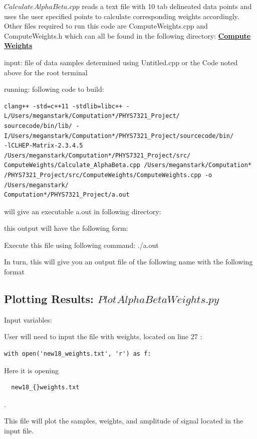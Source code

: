 \documentclass{article}
\begin{document}
$Calculate_{}AlphaBeta.cpp$ reads a text file with 10 tab delineated data points and uses the user specified points to calculate corresponding weights accordingly. 
Other files required to run this code are ComputeWeights.cpp and  ComputeWeights.h which can all be found in the following directory:
\href{https://github.com/atishelmanch/ECAL_Weights/tree/Megan/src/ComputeWeights}{\bf{Compute Weights}}


input: file of data samples determined using Untitled.cpp or the Code noted above for the root terminal 

running: 
following code to build: 

\begin{verbatim} 
clang++ -std=c++11 -stdlib=libc++ -L/Users/meganstark/Computation*/PHYS7321_Project/
sourcecode/bin/lib/ -I/Users/meganstark/Computation*/PHYS7321_Project/sourcecode/bin/ 
-lCLHEP-Matrix-2.3.4.5 /Users/meganstark/Computation*/PHYS7321_Project/src/
ComputeWeights/Calculate_AlphaBeta.cpp /Users/meganstark/Computation*
/PHYS7321_Project/src/ComputeWeights/ComputeWeights.cpp -o /Users/meganstark/
Computation*/PHYS7321_Project/a.out
\end{verbatim}

will give an executable a.out in following directory: 

this output will have the following form: 

Execute this file using following command: ./a.out 

In turn, this will give you an output file of the following name with the following format 

\subsection{Plotting Results:  $ Plot_{}AlphaBetaWeights.py  $ } 

Input variables: 

User will need to input the file with weights, located on line 27 :
\begin{verbatim} 
with open('new18_weights.txt', 'r') as f:  
\end{verbatim}
Here it is opening \begin{verbatim}  new18_{}weights.txt \end{verbatim}.

This file will plot the samples, weights, and amplitude of signal located in the input file. 
\end{document}
